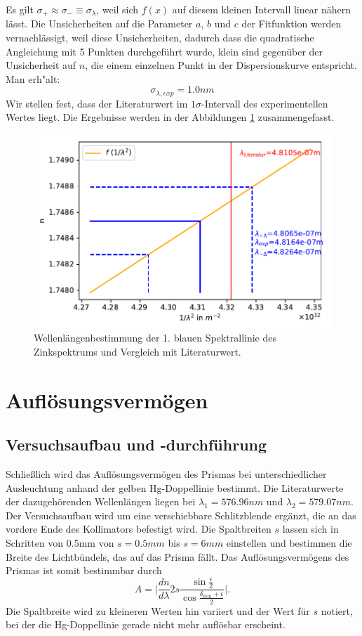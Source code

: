 \documentclass[12pt,a4paper]{article}
\begin{document}
Es gilt $\sigma_+\approx\sigma_-\equiv\sigma_{\lambda}$, weil sich $f(x)$ auf diesem kleinen Intervall linear nähern lässt. Die Unsicherheiten auf die Parameter $a$, $b$ und $c$ der Fitfunktion werden vernachlässigt, weil diese Unsicherheiten, dadurch dass die quadratische Angleichung mit 5 Punkten durchgeführt wurde, klein sind gegenüber der Unsicherheit auf $n$, die einem einzelnen Punkt in der Dispersionskurve entspricht. Man erh"alt:
\begin{equation}
\sigma_{\lambda,exp}=1.0nm
\end{equation}
Wir stellen fest, dass der Literaturwert im $1\sigma$-Intervall des experimentellen Wertes liegt. Die Ergebnisse werden in der Abbildungen \ref{Zn_0} zusammengefasst.
\begin{figure}[H]
	\centering
	\includegraphics[width=0.7\linewidth]{Python/Zn_0.pdf}
	\caption{Wellenlängenbestimmung der 1. blauen Spektrallinie des Zinkspektrums und Vergleich mit Literaturwert.}
	\label{Zn_0}
\end{figure}

\section{Auflösungsvermögen}
\subsection{Versuchsaufbau und -durchführung}
Schließlich wird das Auflösungsvermögen des Prismas bei unterschiedlicher Ausleuchtung anhand der gelben Hg-Doppellinie bestimmt. Die Literaturwerte der dazugehörenden Wellenlängen liegen bei $\lambda_1=576.96nm$ und $\lambda_2=579.07nm$. Der Versuchsaufbau wird um eine verschiebbare Schlitzblende ergänzt, die an das vordere Ende des Kollimators befestigt wird. Die Spaltbreiten $s$ lassen sich in Schritten von 0.5mm von $s=0.5mm$ bis $s=6mm$ einstellen und bestimmen die Breite des Lichtbündels, das auf das Prisma fällt. Das Auflösungsvermögens des Prismas ist somit bestimmbar durch
\begin{equation}\label{Aufloesungsvermoegen_Prisma}
A=\Big|\frac{dn}{d\lambda}2s\frac{\sin{\frac{\epsilon}{2}}}{\cos{\frac{\delta_{min}+\epsilon}{2}}}\Big|.
\end{equation}
Die Spaltbreite wird zu kleineren Werten hin variiert und der Wert für $s$ notiert, bei der die Hg-Doppellinie gerade nicht mehr auflösbar erscheint.
\end{document}
